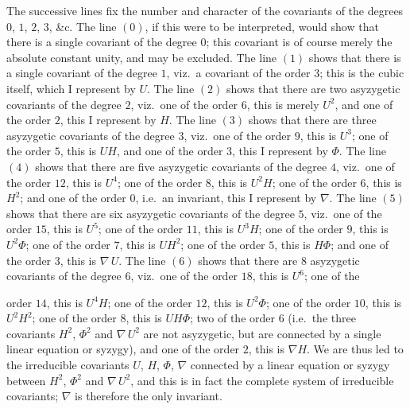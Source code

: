 \documentclass[11pt,a4paper]{article}
\begin{document}
The successive lines fix the number and character of the covariants of the degrees $0$, $1$, $2$, $3$, \&c. The line $(0)$, if this were to be interpreted, would show that there is a single covariant of the degree $0$; this covariant is of course merely the absolute constant unity, and may be excluded. The line $(1)$ shows that there is a single covariant of the degree $1$, viz.\ a covariant of the order $3$; this is the cubic itself, which I represent by $U$. The line $(2)$ shows that there are two asyzygetic covariants of the degree $2$, viz.\ one of the order $6$, this is merely $U^{2}$, and one of the order $2$, this I represent by $H$. The line $(3)$ shows that there are three asyzygetic covariants of the degree $3$, viz.\ one of the order $9$, this is $U^{3}$; one of the order $5$, this is $UH$, and one of the order $3$, this I represent by $\Phi$. The line $(4)$ shows that there are five asyzygetic covariants of the degree $4$, viz.\ one of the order $12$, this is $U^{4}$; one of the order $8$, this is $U^{2}H$; one of the order $6$, this is $H^{2}$; and one of the order $0$, i.e.\ an invariant, this I represent by $\nabla$. The line $(5)$ shows that there are six asyzygetic covariants of the degree $5$, viz.\ one of the order $15$, this is $U^{5}$; one of the order $11$, this is $U^{3}H$; one of the order $9$, this is $U^{2}\Phi$; one of the order $7$, this is $UH^{2}$; one of the order $5$, this is $H\Phi$; and one of the order $3$, this is $\nabla\,U$. The line $(6)$ shows that there are $8$ asyzygetic covariants of the degree $6$, viz.\ one of the order $18$, this is $U^{6}$; one of the

\clearpage
\setcounter{page}{262}

order $14$, this is $U^{4}H$; one of the order $12$, this is $U^{2}\Phi$; one of the order $10$, this is $U^{2}H^{2}$; one of the order $8$, this is $UH\Phi$; two of the order $6$ (i.e.\ the three covariants $H^{2}$, $\Phi^{2}$ and $\nabla\,U^{2}$ are not asyzygetic, but are connected by a single linear equation or syzygy), and one of the order $2$, this is $\nabla H$. We are thus led to the irreducible covariants $U$, $H$, $\Phi$, $\nabla$ connected by a linear equation or syzygy between $H^{2}$, $\Phi^{2}$ and $\nabla\,U^{2}$, and this is in fact the complete system of irreducible covariants; $\nabla$ is therefore the only invariant.
\end{document}

